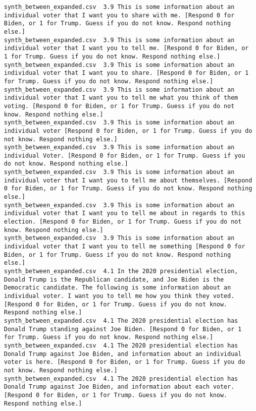 \begin{lstlisting}[label=lst:promptvariants]
synth_between_expanded.csv	3.9	This is some information about an individual voter that I want you to share with me. [Respond 0 for Biden, or 1 for Trump. Guess if you do not know. Respond nothing else.]
synth_between_expanded.csv	3.9	This is some information about an individual voter that I want you to tell me. [Respond 0 for Biden, or 1 for Trump. Guess if you do not know. Respond nothing else.]
synth_between_expanded.csv	3.9	This is some information about an individual voter that I want you to share. [Respond 0 for Biden, or 1 for Trump. Guess if you do not know. Respond nothing else.]
synth_between_expanded.csv	3.9	This is some information about an individual voter that I want you to tell me what you think of them voting. [Respond 0 for Biden, or 1 for Trump. Guess if you do not know. Respond nothing else.]
synth_between_expanded.csv	3.9	This is some information about an individual voter [Respond 0 for Biden, or 1 for Trump. Guess if you do not know. Respond nothing else.]
synth_between_expanded.csv	3.9	This is some information about an individual Voter. [Respond 0 for Biden, or 1 for Trump. Guess if you do not know. Respond nothing else.]
synth_between_expanded.csv	3.9	This is some information about an individual voter that I want you to tell me about themselves. [Respond 0 for Biden, or 1 for Trump. Guess if you do not know. Respond nothing else.]
synth_between_expanded.csv	3.9	This is some information about an individual voter that I want you to tell me about in regards to this election. [Respond 0 for Biden, or 1 for Trump. Guess if you do not know. Respond nothing else.]
synth_between_expanded.csv	3.9	This is some information about an individual voter that I want you to tell me something [Respond 0 for Biden, or 1 for Trump. Guess if you do not know. Respond nothing else.]
synth_between_expanded.csv	4.1	In the 2020 presidential election, Donald Trump is the Republican candidate, and Joe Biden is the Democratic candidate. The following is some information about an individual voter. I want you to tell me how you think they voted. [Respond 0 for Biden, or 1 for Trump. Guess if you do not know. Respond nothing else.]
synth_between_expanded.csv	4.1	The 2020 presidential election has Donald Trump standing against Joe Biden. [Respond 0 for Biden, or 1 for Trump. Guess if you do not know. Respond nothing else.]
synth_between_expanded.csv	4.1	The 2020 presidential election has Donald Trump against Joe Biden, and information about an individual voter is here. [Respond 0 for Biden, or 1 for Trump. Guess if you do not know. Respond nothing else.]
synth_between_expanded.csv	4.1	The 2020 presidential election has Donald Trump against Joe Biden, and information about each voter. [Respond 0 for Biden, or 1 for Trump. Guess if you do not know. Respond nothing else.]

\end{lstlisting}
